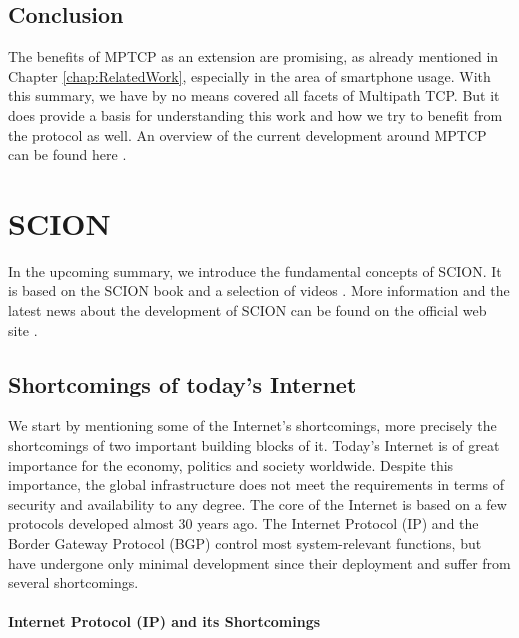 \subsection*{Conclusion}

The benefits of MPTCP as an extension are promising, as already mentioned in Chapter \ref{chap:RelatedWork}, especially in the area of smartphone usage.  With this summary, we have by no means covered all facets of Multipath TCP. But it does provide a basis for understanding this work and how we try to benefit from the protocol as well. An overview of the current development around MPTCP can be found here \cite{MPTCPWebMain}.

\section{SCION}
\label{sec:SCION}

In the upcoming summary, we introduce the fundamental concepts of SCION. It is based on the SCION book \cite{SCIONBook} and a selection of videos \cite{SCIONWebVideos}. More information and the latest news about the development of SCION can be found on the official web site \cite{SCIONWebMain}.

\subsection*{Shortcomings of today's Internet}

We start by mentioning some of the Internet's shortcomings, more precisely the shortcomings of two important building blocks of it. Today's Internet is of great importance for the economy, politics and society worldwide. Despite this importance, the global infrastructure does not meet the requirements in terms of security and availability to any degree. The core of the Internet is based on a few protocols developed almost 30 years ago. The Internet Protocol (IP) and the Border Gateway Protocol (BGP) control most system-relevant functions, but have undergone only minimal development since their deployment and suffer from several shortcomings.

\paragraph{Internet Protocol (IP) and its Shortcomings}


